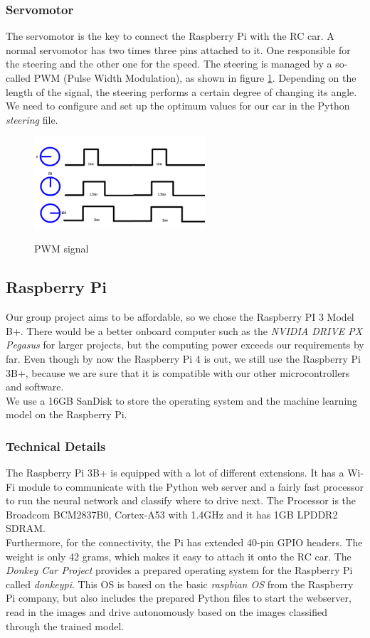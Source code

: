 \documentclass[journal]{IEEEtran}
\begin{document}
\subsubsection{Servomotor}
The servomotor is the key to connect the Raspberry Pi with the RC car. A normal servomotor has two times three pins attached to it. One responsible for the steering and the other one for the speed. The steering is managed by a so-called PWM (Pulse Width Modulation), as shown in figure \ref{pwm}. Depending on the length of the signal, the steering performs a certain degree of changing its angle. We need to configure and set up the optimum values for our car in the Python \textit{steering} file.\\
\begin{figure}
  \begin{center}
  \includegraphics[width=2.5in]{photo/pwm}\\
  \caption{PWM signal}\label{pwm}
  \end{center}
\end{figure}
\subsection{Raspberry Pi}
Our group project aims to be affordable, so we chose the Raspberry PI 3 Model B+. There would be a better onboard computer such as the \textit{NVIDIA DRIVE PX Pegasus} for larger projects, but the computing power exceeds our requirements by far.
Even though by now the Raspberry Pi 4 is out, we still use the Raspberry Pi 3B+, because we are sure that it is compatible with our other microcontrollers and software. \\
We use a 16GB SanDisk to store the operating system and the machine learning model on the Raspberry Pi. \\
\subsubsection{Technical Details}
The Raspberry Pi 3B+ is equipped with a lot of different extensions. It has a Wi-Fi module to communicate with the Python web server and a fairly fast processor to run the neural network and classify where to drive next. The Processor is the Broadcom BCM2837B0, Cortex-A53 with 1.4GHz and it has 1GB LPDDR2 SDRAM. \\
Furthermore, for the connectivity, the Pi has extended 40-pin GPIO headers. The weight is only 42 grams, which makes it easy to attach it onto the RC car. The \textit{Donkey Car Project} \cite{donkey} provides a prepared operating system for the Raspberry Pi called \textit{donkeypi}. This OS is based on the basic \textit{raspbian OS} from the Raspberry Pi company, but also includes the prepared Python files to start the webserver, read in the images and drive autonomously based on the images classified through the trained model. \\
\end{document}

